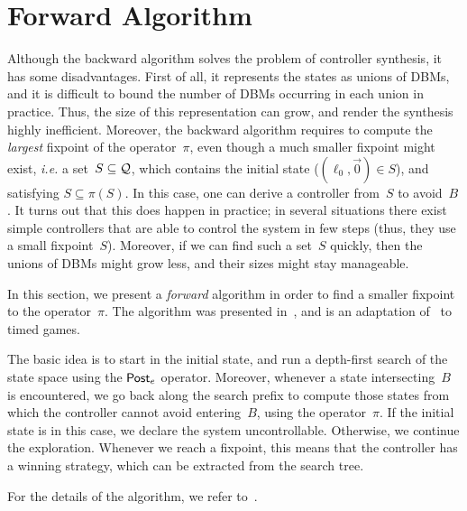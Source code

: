 \documentclass{article}
\begin{document}
\section{Forward Algorithm}
\label{section:forward}
Although the backward algorithm solves the problem of controller synthesis, it
has some disadvantages. 
First of all, it represents the states as
unions of DBMs, and it is difficult to bound the number of DBMs occurring in
each union in practice. Thus, the size of this representation can grow, and
render the synthesis highly inefficient.
Moreover, the backward algorithm requires to compute the \emph{largest}
fixpoint of the operator~$\pi$, even though a much smaller fixpoint might
exist, \textit{i.e.}
a set~$S\subseteq \mathcal{Q}$, which
contains the initial state ($(\ell_0,\vec{0}) \in S$), and satisfying $S \subseteq
\pi(S)$. In this case, one can derive a controller from~$S$ to avoid~$B$.
It turns out that this does happen in practice; in several situations
there exist simple controllers that are able to control the system in few steps
(thus, they use a small fixpoint~$S$).
Moreover, if we can find such a set~$S$ quickly, then the unions
of DBMs might grow less, and their sizes might stay manageable.

In this section, we present a \emph{forward} algorithm in order to find a
smaller fixpoint to the operator~$\pi$.
The algorithm was presented in~\cite{Cassez05}, and
is an adaptation of~\cite{LiuS98} to timed games.

The basic idea is to start in the initial state, and run a depth-first search 
of the state space using the $\textrm{\sf Post}_e$ operator. Moreover, whenever a state
intersecting~$B$ is encountered, we go back along the search prefix 
to compute those states from which the controller cannot avoid entering~$B$, using the operator~$\pi$. 
If the initial state is in this case, we declare the system uncontrollable.
Otherwise, we continue the exploration. Whenever we reach a fixpoint, this means that
the controller has a winning strategy, which can be extracted from the search
tree.

For the details of the algorithm, we refer to~\cite{Cassez05}.
\end{document}
